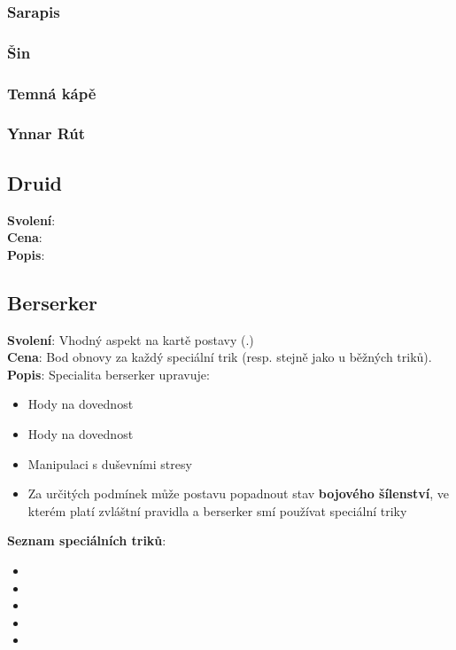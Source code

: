 \documentclass[../main.tex]{subfiles}
\begin{document}
\subsubsection{Sarapis}
\label{sec:sarapis}

\subsubsection{Šin}
\label{sec:sin}

\subsubsection{Temná kápě}
\label{sec:temna-kap}

\subsubsection{Ynnar Rút}
\label{sec:ynnar-rut}


\begin{povolani}
  
\subsection{Druid}
\label{sec:pov-druid}
\textbf{Svolení}:\\
\textbf{Cena}:\\
\textbf{Popis}:\\

\end{povolani}

\begin{povolani}
\subsection{Berserker}
\label{sec:berserker}
\textbf{Svolení}: Vhodný aspekt na kartě postavy (.)\\
\textbf{Cena}: Bod obnovy za každý speciální trik (resp. stejně jako u běžných triků).\\
\textbf{Popis}: Specialita berserker upravuje:
\begin{itemize}
    \item Hody na dovednost 
    \item Hody na dovednost 
    \item Manipulaci s duševními stresy
    \item Za určitých podmínek může postavu popadnout stav \textbf{bojového šílenství}, ve kterém platí zvláštní pravidla a berserker smí používat speciální triky
\end{itemize}
\textbf{Seznam speciálních triků}:
\begin{itemize}
    \item {}
    \item {}
    \item {}
    \item {}
    \item {}
\end{itemize}
\end{povolani}
\end{document}
